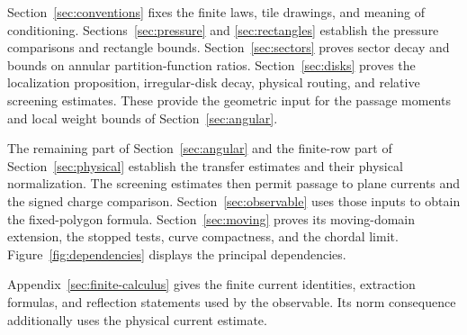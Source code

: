 Section~\ref{sec:conventions} fixes the finite laws, tile drawings, and
meaning of conditioning. Sections~\ref{sec:pressure} and
\ref{sec:rectangles} establish the pressure comparisons and rectangle
bounds. Section~\ref{sec:sectors} proves sector decay and bounds on
annular partition-function ratios. Section~\ref{sec:disks} proves the
localization proposition, irregular-disk decay, physical routing, and
relative screening estimates. These provide the geometric input for
the passage moments and local weight bounds of
Section~\ref{sec:angular}.

The remaining part of Section~\ref{sec:angular} and the finite-row part
of Section~\ref{sec:physical} establish the transfer estimates and their
physical normalization. The screening estimates then permit passage
to plane currents and the signed charge comparison.
Section~\ref{sec:observable} uses those inputs to obtain the
fixed-polygon formula. Section~\ref{sec:moving} proves its moving-domain
extension, the stopped tests, curve compactness, and the chordal limit.
Figure~\ref{fig:dependencies} displays the principal dependencies.



Appendix~\ref{sec:finite-calculus} gives the finite current identities,
extraction formulas, and reflection statements used by the observable.
Its norm consequence additionally uses the physical current estimate.
